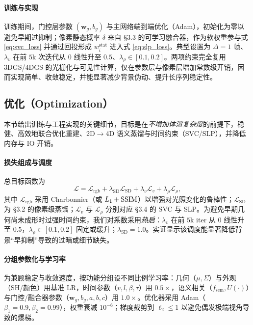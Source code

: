 \documentclass[10pt,conference]{IEEEtran} %
\begin{document}
\paragraph{训练与实现}
训练期间，门控层参数 $(\mathbf w_g,b_g)$ 与主网络端到端优化（Adam），初始化为零以避免早期过抑制；像素静态概率 $\delta$ 来自 §3.3 的可学习融合器，作为软权重参与式 \eqref{eq:svc_loss} 并通过回投形成 $w_i^{\mathrm{stat}}$ 进入式 \eqref{eq:slp_loss}。典型设置为 $\Delta{=}1$ 帧、$\lambda_v$ 在前 $5$k 次迭代从 $0$ 线性升至 $0.5$、$\lambda_\rho\in[0.1,0.2]$。两项约束完全复用 3DGS/4DGS 的光栅化与可见性计算，仅在参数层与像素层增加常数级开销，因而实现简单、收敛稳定，并能显著减少背景伪动、提升长序列稳定性。


\subsection{优化（Optimization）}
本节给出训练与工程实现的关键细节，目标是在\emph{不增加体渲复杂度}的前提下，稳健、高效地联合优化重建、2D$\rightarrow$4D 语义蒸馏与时间约束（SVC/SLP），并降低内存与 IO 开销。

\paragraph{损失组成与调度}
总目标函数为
\begin{equation}
\mathcal L=\mathcal L_{\mathrm{rgb}}+\lambda_{\mathrm{SD}}\mathcal L_{\mathrm{SD}}
+\lambda_v \mathcal L_v+\lambda_\rho \mathcal L_\rho,
\label{eq:opt_total}
\end{equation}
其中 $\mathcal L_{\mathrm{rgb}}$ 采用 Charbonnier（或 $L_1+{\rm SSIM}$）以增强对光照变化的鲁棒性；$\mathcal L_{\mathrm{SD}}$ 为 §3.2 的像素级蒸馏；$\mathcal L_v$ 与 $\mathcal L_\rho$ 分别对应 §3.4 的 SVC 与 SLP。为避免早期几何尚未成形时过强时间约束，我们对系数采用\emph{热启}：$\lambda_v$ 在前 $5$k iter 从 $0$ 线性升至 $0.5$，$\lambda_\rho\!\in[0.1,0.2]$ 固定或缓升；$\lambda_{\mathrm{SD}}{=}1.0$。实证显示该调度能显著降低背景“早抑制”导致的过暗或细节缺失。

\paragraph{分组参数化与学习率}
为兼顾稳定与收敛速度，按功能分组设不同比例学习率：几何（$\mu,\Sigma$）与外观（SH/颜色）用基准 LR，时间参数（$v,l,\beta,\tau$）用 $0.5\times$，语义相关（$f_{\mathrm{sem}},U(\cdot)$）与门控/融合器参数（$\mathbf w_g,b_g,a,b,c$）用 $1.0\times$。优化器采用 Adam（$\beta_1{=}0.9,\beta_2{=}0.99$），权重衰减 $10^{-6}$；梯度裁剪到 $\ell_2\!\leq\!1$ 以避免偶发极端视角导致的爆梯。
\end{document}
